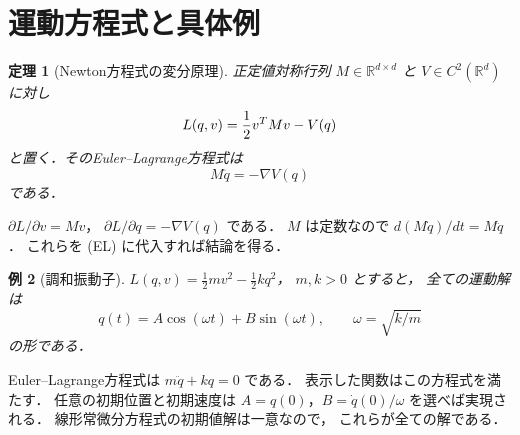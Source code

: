 \documentclass[a5paper,10pt,onecolumn]{jsarticle}
\makeatletter
\theoremstyle{mathnotetheorem}
\newtheorem{theorem}{定理}[section]
\newtheorem{example}[theorem]{例}
\renewcommand{\proofname}{証明}
\renewenvironment{proof}[1][\proofname]{%
  \par\pushQED{\qed}\normalfont\topsep4\p@\@plus2\p@\relax
  \trivlist\item[\hskip\labelsep\bfseries #1]\ignorespaces
}{\popQED\endtrivlist\@endpefalse}
\makeatother
\begin{document}
\section{運動方程式と具体例}
\begin{theorem}[Newton方程式の変分原理]
正定値対称行列 $M\in\mathbb R^{d\times d}$ と
$V\in C^2(\mathbb R^d)$ に対し
\[
 L(q,v)={1\over2}v^TMv-V(q)
\]
と置く．そのEuler--Lagrange方程式は
\[
 M\ddot q=-\nabla V(q)
\]
である．
\end{theorem}
\begin{proof}
$\partial L/\partial v=Mv$，
$\partial L/\partial q=-\nabla V(q)$ である．
$M$ は定数なので
$d(M\dot q)/dt=M\ddot q$．
これらを (EL) に代入すれば結論を得る．
\end{proof}
\begin{example}[調和振動子]
$L(q,v)=\tfrac12mv^2-\tfrac12kq^2$，
$m,k>0$ とすると，
全ての運動解は
\[
 q(t)=A\cos(\omega t)+B\sin(\omega t),\qquad
 \omega=\sqrt{k/m}
\]
の形である．
\end{example}
\begin{proof}
Euler--Lagrange方程式は
$m\ddot q+kq=0$ である．
表示した関数はこの方程式を満たす．
任意の初期位置と初期速度は
$A=q(0)$，$B=\dot q(0)/\omega$ を選べば実現される．
線形常微分方程式の初期値解は一意なので，
これらが全ての解である．
\end{proof}
\end{document}
